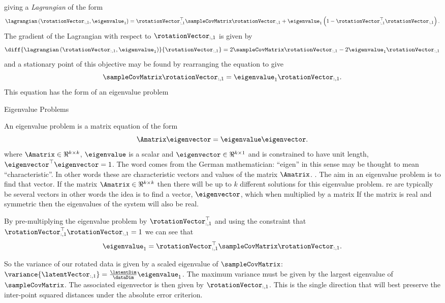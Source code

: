 giving a \emph{\gls{Lagrangian}} of the form
\[
\lagrangian\left(\rotationVector_{:, 1},\eigenvalue_{1}\right)=\rotationVector_{:, 1}^{\top}\sampleCovMatrix\rotationVector_{:, 1}+\eigenvalue_{1}\left(1-\rotationVector_{:, 1}^{\top}\rotationVector_{:, 1}\right).
\]
The gradient of the Lagrangian with respect to $\rotationVector_{:, 1}$
is given by
\[
\diff{\lagrangian\left(\rotationVector_{:, 1},\eigenvalue_{1}\right)}{\rotationVector_{:, 1}}=2\sampleCovMatrix\rotationVector_{:, 1}-2\eigenvalue_{1}\rotationVector_{:, 1}
\]
and a stationary point of this objective may be found by rearranging the equation to give
\begin{equation}
  \sampleCovMatrix\rotationVector_{:, 1}=\eigenvalue_{1}\rotationVector_{:, 1}.\label{eq:principalEigenvector}
\end{equation}
This equation has the form of an eigenvalue problem
\begin{boxfloat}
  \caption{Eigenvalue Problems}\label{box:eigenvalueProblem}

  \boxfontsize An eigenvalue problem is a matrix equation of the form
  \[
  \Amatrix \eigenvector = \eigenvalue \eigenvector. 
  \]
  where $\Amatrix\in\Re^{k\times k}$, $\eigenvalue$ is a scalar and $\eigenvector\in\Re^{k\times 1}$ and is constrained to have unit length, $\eigenvector^\top\eigenvector=1$. The word comes from the German mathematician: ``eigen'' in this sense may be thought to mean ``characteristic''. In other words these are characteristic vectors and values of the matrix $\Amatrix$. . The aim in an eigenvalue problem is to find that vector. If the matrix $\Amatrix\in\Re^{k\times k}$ then there will be up to $k$ different solutions for this eigenvalue problem. re are typically  be several vectors in other words the idea is to find a vector, $\eigenvector$, which when multiplied by a matrix  
  If the matrix is real and symmetric then the eigenvalues of the system will also be real.
\end{boxfloat}
By pre-multiplying the eigenvalue problem by
$\rotationVector_{:, 1}^{\top}$ and using the constraint that
$\rotationVector_{:, 1}^\top\rotationVector_{:, 1}=1$ we can see that
\[
\eigenvalue_{1}=\rotationVector_{:, 1}^{\top}\sampleCovMatrix\rotationVector_{:, 1}.
\]

So the variance of our rotated data is given by a scaled eigenvalue of
$\sampleCovMatrix$: $\variance{\latentVector_{:,
    1}}=\frac{\latentDim}{\dataDim}\eigenvalue_1$. The maximum
variance must be given by the largest eigenvalue of
$\sampleCovMatrix$. The associated eigenvector is then given by
$\rotationVector_{:, 1}$. This is the single direction that will best
preserve the inter-point squared distances under the absolute error
criterion. %

